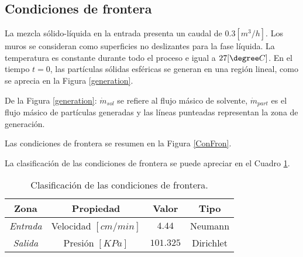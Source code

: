 \subsection{Condiciones de frontera}

\noindent
\justify

La mezcla s\'olido-l\'iquida en la entrada presenta un caudal de $0.3 \left[m^3 /h \right]$. Los muros se consideran como superficies no deslizantes para la fase l\'iquida. La temperatura es constante durante todo el proceso e igual a $27 [\degree C]$. En el tiempo $t=0$, las part\'iculas s\'olidas esf\'ericas se generan en una regi\'on lineal, como se aprecia en la Figura \ref{generation}.



\noindent
\justify

De la Figura \ref{generation}: $\dot{m} _{sol}$ se refiere al flujo m\'asico de solvente, $\dot{m} _{part}$ es el flujo m\'asico de part\'iculas generadas y las l\'ineas punteadas representan la zona de generaci\'on.

\noindent
\justify

Las condiciones de frontera se resumen en la Figura \ref{ConFron}.



\noindent
\justify

La clasificaci\'on de las condiciones de frontera se puede apreciar en el Cuadro \ref{CFT}.

\begin{table}[h!]
	\centering
	\begin{tabular}{|c|c|c|c|}
		\hline
		\textbf{Zona} & \textbf{Propiedad} & \textbf{Valor} & \textbf{Tipo} \\ \hline
		\textit{Entrada} & Velocidad $[cm/min]$ & $4.44$ & Neumann \\ \hline
		\textit{Salida} & Presi\'on $[KPa]$ & $101.325$ & Dirichlet \\ \hline
	\end{tabular}
	\caption{Clasificaci\'on de las condiciones de frontera.}
	\label{CFT}
\end{table}
